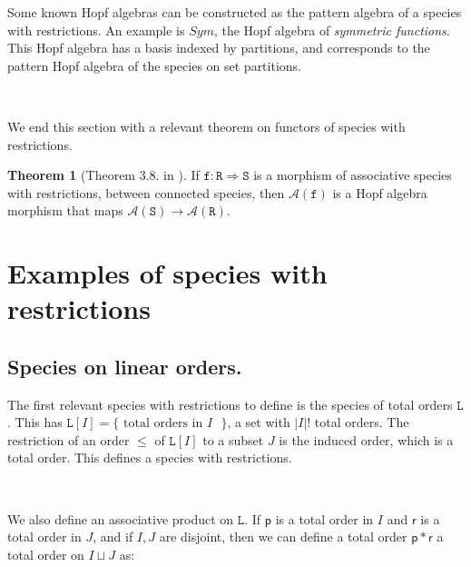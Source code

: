 \documentclass[12pt, reqno]{amsart}
\theoremstyle{definition}
\newtheorem{thm}{Theorem}[section]
\newcommand{\prR}{\mathtt{R}}
\begin{document}
Some known Hopf algebras can be constructed as the pattern algebra of a species with restrictions.
An example is $Sym$, the Hopf algebra of \textit{symmetric functions}.
This Hopf algebra has a basis indexed by partitions, and corresponds to the pattern Hopf algebra of the species on set partitions.

\

We end this section with a relevant theorem on functors of species with restrictions.

\begin{thm}[Theorem 3.8. in \cite{Penaguiao2020}]\label{thm:functoriality}
    If $\mathtt{f} : \prR \Rightarrow \mathtt{S}$ is a morphism of associative species with restrictions, between connected species, then $\mathcal A(\mathtt{f})$ is a Hopf algebra morphism that maps $\mathcal A(\mathtt{S}) \to \mathcal A(\mathtt{R})$.
\end{thm}

\section{Examples of species with restrictions \label{sec:species_restrictions}}

\subsection{Species on linear orders.\label{sec:specieslinearorders}}

The first relevant species with restrictions to define is the species of total orders $\mathtt{L}$.
This has $\mathtt{L}[I] = \{\text{ total orders in $I$ }\}$, a set with $|I|!$ total orders.
The restriction of an order $\leq $ of $\mathtt{L}[I]$ to a subset $J$ is the induced order, which is a total order.
This defines a species with restrictions.

\

We also define an associative product on $\mathtt{L}$.
If $\mathsf{p}$ is a total order in $I$ and $\mathsf{r}$ is a total order in $J$, and if $I, J$ are disjoint, then we can define a total order $\mathsf{p} \ast\mathsf{r}$ a total order on $I \sqcup J$ as:
\end{document}
